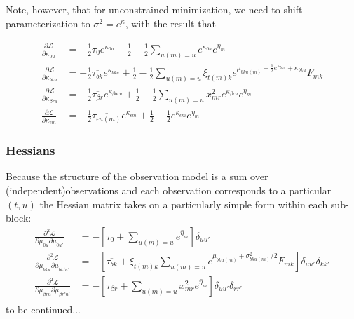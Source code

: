 \documentclass[11pt]{article}
\begin{document}
Note, however, that for unconstrained minimization, we need to shift parameterization to $\sigma^2 = e^\kappa$, with the result that

\begin{align}
    \frac{\partial\mathcal{L}}{\partial \kappa_{0u}} &= -\frac{1}{2}\tau_0 e^{\kappa_{0u}} + \frac{1}{2} - \frac{1}{2} \sum_{u(m) = u} e^{\kappa_{0u}} \overline{e^{\eta_m}} \\
    \frac{\partial\mathcal{L}}{\partial \kappa_{bku}} &= 
    - \frac{1}{2} \overline{\tau_{bk}} e^{\kappa_{bku}} + \frac{1}{2} - \frac{1}{2}\sum_{u(m) = u} \xi_{t(m)k} e^{\mu_{bku(m)} + \frac{1}{2} e^{\kappa_{bku}} + \kappa_{bku}} F_{mk}  \\
    \frac{\partial\mathcal{L}}{\partial \kappa_{\beta ru}} &= 
    - \frac{1}{2} \overline{\tau_{\beta r}} e^{\kappa_{\beta bru}} + 
    \frac{1}{2} - \frac{1}{2} \sum_{u(m) = u} x^2_{mr} e^{\kappa_{\beta ru}} \overline{e^{\eta_m}} \\
    \frac{\partial\mathcal{L}}{\partial \kappa_{\epsilon m}} &= 
    -\frac{1}{2} \overline{\tau_{\epsilon u(m)}} e^{\kappa_{\epsilon m}} + \frac{1}{2} - \frac{1}{2} e^{\kappa_{\epsilon m}} \overline{e^{\eta_m}}
\end{align}

\subsubsection{Hessians}
Because the structure of the observation model is a sum over (independent)observations and each observation corresponds to a particular $(t, u)$ the Hessian matrix takes on a particularly simple form within each sub-block:
\begin{align}
    \frac{\partial^2\mathcal{L}}{\partial \mu_{0u}\partial \mu_{0u'}} &=
    -\left[\tau_0 + \sum_{u(m)=u} \overline{e^{\eta_m}}\right]\delta_{uu'} \\
    \frac{\partial^2\mathcal{L}}{\partial \mu_{bku}\partial \mu_{bk'u'}} &=
    -\left[\overline{\tau_{bk}} + \xi_{t(m) k}\sum_{u(m) = u} e^{\mu_{bku(m)} + \sigma^2_{bku(m)} / 2} F_{mk} \right]\delta_{uu'} \delta_{k k'} \\
    \frac{\partial^2\mathcal{L}}{\partial \mu_{\beta ru}\partial \mu_{\beta r'u'}} &=
    -\left[\overline{\tau_{\beta r}} + \sum_{u(m) = u} x^2_{mr} \overline{e^{\eta_m}} \right]\delta_{uu'} \delta_{r r'} \\
\end{align}
to be continued...
\end{document}
